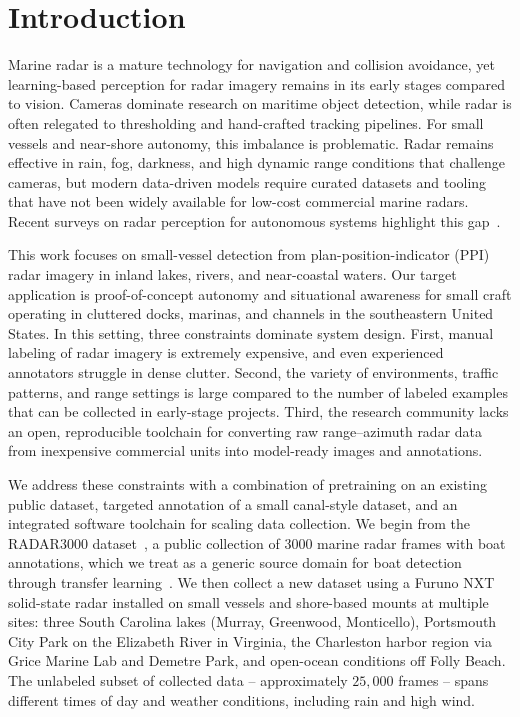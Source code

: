 \documentclass[twocolumn, 10pt]{article}
\begin{document}
\section{Introduction}
Marine radar is a mature technology for navigation and collision avoidance, yet learning-based perception for radar imagery remains in its early stages compared to vision. Cameras dominate research on maritime object detection, while radar is often relegated to thresholding and hand-crafted tracking pipelines. For small vessels and near-shore autonomy, this imbalance is problematic. Radar remains effective in rain, fog, darkness, and high dynamic range conditions that challenge cameras, but modern data-driven models require curated datasets and tooling that have not been widely available for low-cost commercial marine radars. Recent surveys on radar perception for autonomous systems highlight this gap~\cite{zhou2022deep_radar_perception_sensors, srivastav2023radars_for_autonomous_driving_arxiv}.

This work focuses on small-vessel detection from plan-position-indicator (PPI) radar imagery in inland lakes, rivers, and near-coastal waters. Our target application is proof-of-concept autonomy and situational awareness for small craft operating in cluttered docks, marinas, and channels in the southeastern United States. In this setting, three constraints dominate system design. First, manual labeling of radar imagery is extremely expensive, and even experienced annotators struggle in dense clutter. Second, the variety of environments, traffic patterns, and range settings is large compared to the number of labeled examples that can be collected in early-stage projects. Third, the research community lacks an open, reproducible toolchain for converting raw range--azimuth radar data from inexpensive commercial units into model-ready images and annotations.

We address these constraints with a combination of pretraining on an existing public dataset, targeted annotation of a small canal-style dataset, and an integrated software toolchain for scaling data collection. We begin from the RADAR3000 dataset~\cite{kz258852_radar300_dataset_m_radar}, a public collection of $3000$ marine radar frames with boat annotations, which we treat as a generic source domain for boat detection through transfer learning~\cite{pan2010transfer_learning_survey}. We then collect a new dataset using a Furuno NXT solid-state radar installed on small vessels and shore-based mounts at multiple sites: three South Carolina lakes (Murray, Greenwood, Monticello), Portsmouth City Park on the Elizabeth River in Virginia, the Charleston harbor region via Grice Marine Lab and Demetre Park, and open-ocean conditions off Folly Beach. The unlabeled subset of collected data -- approximately $25,000$ frames -- spans different times of day and weather conditions, including rain and high wind.
\end{document}
